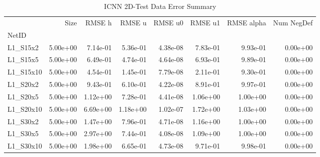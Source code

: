 \documentclass{article}
\theoremstyle{remark}
\numberwithin{equation}{subsection}
\begin{document}
\begin{table}[H]
 \begin{tabular}{lrrrrrrr}
	\toprule
	{} &     Size &   RMSE h &   RMSE u &  RMSE u0 &  RMSE u1 &  RMSE alpha &  Num NegDef \\
	NetID     &          &          &          &          &          &             &             \\
	\midrule
	L1\_S15x2  & 5.00e+00 & 7.14e-01 & 5.36e-01 & 4.38e-08 & 7.83e-01 &    9.93e-01 &    0.00e+00 \\
	L1\_S15x5  & 5.00e+00 & 6.49e-01 & 4.74e-01 & 4.64e-08 & 6.93e-01 &    9.89e-01 &    0.00e+00 \\
	L1\_S15x10 & 5.00e+00 & 4.54e-01 & 1.45e-01 & 7.79e-08 & 2.11e-01 &    9.30e-01 &    0.00e+00 \\
	L1\_S20x2  & 5.00e+00 & 9.43e-01 & 6.10e-01 & 4.22e-08 & 8.91e-01 &    9.97e-01 &    0.00e+00 \\
	L1\_S20x5  & 5.00e+00 & 1.12e+00 & 7.28e-01 & 4.41e-08 & 1.06e+00 &    1.00e+00 &    0.00e+00 \\
	L1\_S20x10 & 5.00e+00 & 6.69e+00 & 1.18e+00 & 1.02e-07 & 1.72e+00 &    1.03e+00 &    0.00e+00 \\
	L1\_S30x2  & 5.00e+00 & 1.47e+00 & 7.96e-01 & 4.71e-08 & 1.16e+00 &    1.00e+00 &    0.00e+00 \\
	L1\_S30x5  & 5.00e+00 & 2.97e+00 & 7.44e-01 & 4.08e-08 & 1.09e+00 &    1.00e+00 &    0.00e+00 \\
	L1\_S30x10 & 5.00e+00 & 1.98e+00 & 6.65e-01 & 4.73e-08 & 9.71e-01 &    9.98e-01 &    0.00e+00 \\
	\bottomrule
\end{tabular}

\caption{ICNN 2D-Test Data Error Summary}
\end{table}
\end{document}
